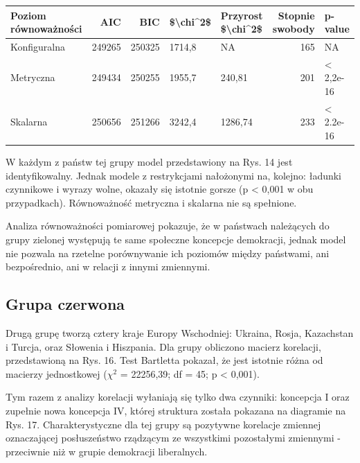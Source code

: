 \documentclass[12pt]{article}
\begin{document}
\begin{tabular}{l|r|r|l|l|r|l}
\hline
Poziom równoważności & AIC & BIC & \$\textbackslash{}chi\textasciicircum{}2\$ & Przyrost \$\textbackslash{}chi\textasciicircum{}2\$ & Stopnie swobody & p-value\\
\hline
Konfiguralna & 249265 & 250325 & 1714,8 & NA & 165 & NA\\
\hline
Metryczna & 249434 & 250255 & 1955,7 & 240,81 & 201 & < 2,2e-16\\
\hline
Skalarna & 250656 & 251266 & 3242,4 & 1286,74 & 233 & < 2.2e-16\\
\hline
\end{tabular}

W każdym z państw tej grupy model przedstawiony na Rys. 14 jest identyfikowalny. Jednak modele z restrykcjami nałożonymi na, kolejno: ładunki czynnikowe i wyrazy wolne, okazały się istotnie gorsze (p \textless{} 0,001 w obu przypadkach). Równoważność metryczna i skalarna nie są spełnione.

Analiza równoważności pomiarowej pokazuje, że w państwach należących do grupy zielonej występują te same społeczne koncepcje demokracji, jednak model nie pozwala na rzetelne porównywanie ich poziomów między państwami, ani bezpośrednio, ani w relacji z innymi zmiennymi.

\hypertarget{grupa-czerwona}{%
\subsection{Grupa czerwona}\label{grupa-czerwona}}

Drugą grupę tworzą cztery kraje Europy Wschodniej: Ukraina, Rosja, Kazachstan i Turcja, oraz Słowenia i Hiszpania. Dla grupy obliczono macierz korelacji, przedstawioną na Rys. 16. Test Bartletta pokazał, że jest istotnie różna od macierzy jednostkowej (\(\chi^2\) = 22256,39; df = 45; p \textless{} 0,001).

Tym razem z analizy korelacji wyłaniają się tylko dwa czynniki: koncepcja I oraz zupełnie nowa koncepcja IV, której struktura została pokazana na diagramie na Rys. 17. Charakterystyczne dla tej grupy są pozytywne korelacje zmiennej oznaczającej posłuszeństwo rządzącym ze wszystkimi pozostałymi zmiennymi - przeciwnie niż w grupie demokracji liberalnych.
\end{document}
